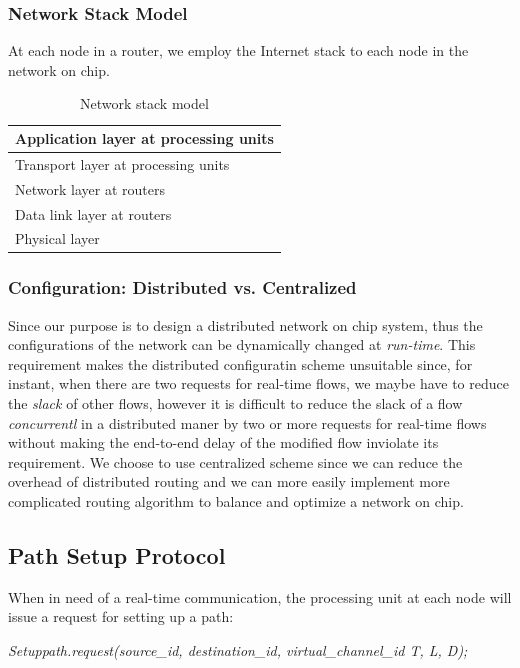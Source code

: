 \documentclass[conference, twocolumn]{IEEEtran}
\theoremstyle{definition}
\begin{document}
\subsubsection{Network Stack Model}
At each node in a router, we employ the Internet stack to each node in the 
network on chip.
\begin{table}[h]
\begin{center}
  \begin{tabular}{ | l | }
    \hline
    Application layer at processing units \\ \hline
    Transport layer at processing units \\ \hline
    Network layer at routers \\ \hline
	Data link layer at routers \\ \hline
	Physical layer \\
    \hline
  \end{tabular}
\end{center}
\caption{Network stack model}
\label{table:NetworkStack}
\end{table}

\subsubsection{Configuration: Distributed vs. Centralized}
Since our purpose is to design a distributed network on chip system, thus the
configurations of the network can be dynamically changed at {\em run-time}.
This requirement makes the distributed configuratin scheme unsuitable since,
for instant, when there are two requests for real-time flows, we maybe have to
reduce the {\em slack} of other flows, however it is difficult to reduce the
slack of a flow {\em concurrentl} in a distributed maner by two or more
requests for real-time flows without making the end-to-end delay of the
modified flow inviolate its requirement. We choose to use centralized scheme
since we can reduce the overhead of distributed routing and we can more easily
implement more complicated routing algorithm to balance and optimize a network
on chip.

\subsection{Path Setup Protocol}
When in need of a real-time communication, the processing unit at each node 
will issue a request for setting up a path:

{\em Setuppath.request(source\_id, destination\_id, virtual\_channel\_id T, L,
D);}
\end{document}
